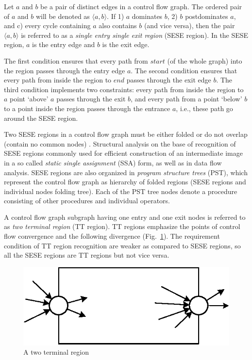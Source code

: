 \documentclass[conference]{IEEEtran}
\begin{document}
Let $a$ and $b$ be a pair of distinct edges in a control flow graph.  The ordered pair of $a$ and $b$ will be denoted as $\langle a,b \rangle$.  If 1) $a$ dominates $b$, 2) $b$ postdominates $a$, and c) every cycle containing $a$ also contains $b$ (and vice versa), then the pair $\langle a,b \rangle$ is referred to as a \emph{single entry single exit region} (SESE region).  In the SESE region, $a$ is the entry edge and $b$ is the exit edge.

The first condition ensures that every path from $start$ (of the whole graph) into the region passes through the entry edge $a$.  The second condition ensures that every path from inside the region to $end$ passes through the exit edge $b$.  The third condition implements two constraints: every path from inside the region to $a$ point ‘above’ $a$ passes through the exit $b$, and every path from a point ‘below’ $b$ to a point inside the region passes through the entrance $a$, i.e., these path go around the SESE region.

Two SESE regions in a control flow graph must be either folded or do not overlap (contain no common nodes) \cite{sese}.  Structural analysis on the base of recognition of SESE regions commonly used for efficient construction of an intermediate image in a so called \emph{static single assignment} (SSA) form, as well as in data flow analysis.  SESE regions are also organized in \emph{program structure trees} (PST), which represent the control flow graph as hierarchy of folded regions (SESE regions and individual nodes folding tree).  Each of the PST tree nodes denote a procedure consisting of other procedures and individual operators.

A control flow graph subgraph having one entry and one exit nodes is referred to as \emph{two terminal region} (TT region).  TT regions emphasize the points of control flow convergence and the following divergence (Fig.~\ref{fig:TTRegion}).  The requirement condition of TT region recognition are weaker as compared to SESE regions, so all the SESE regions are TT regions but not vice versa.
\begin{figure}[tb]
	\centering
		\includegraphics[width=0.4\linewidth]{Pic/TTRegion.eps}
	\caption{A two terminal region}
	\label{fig:TTRegion}
\end{figure}
\end{document}
